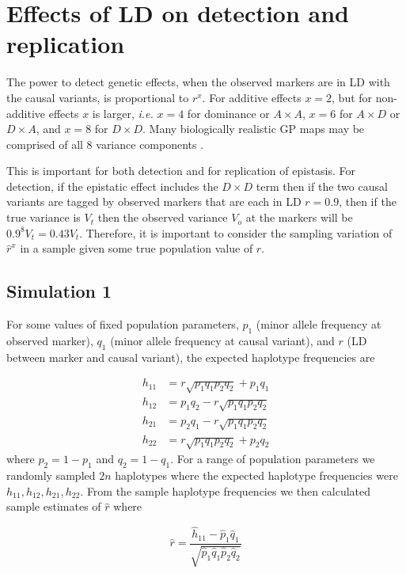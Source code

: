 \documentclass{article}
\begin{document}
\section{Effects of LD on detection and replication}

The power to detect genetic effects, when the observed markers are in LD with the causal variants, is proportional to $r^x$. For additive effects $x = 2$, but for non-additive effects $x$ is larger, \emph{i.e.} $x = 4$ for dominance or $A \times A$, $x = 6$ for $A \times D$ or $D \times A$, and $x = 8$ for $D \times D$. Many biologically realistic GP maps may be comprised of all 8 variance components \cite{Hemani2013}. 

This is important for both detection and for replication of epistasis. For detection, if the epistatic effect includes the $D \times D$ term then if the two causal variants are tagged by observed markers that are each in LD $r = 0.9$, then if the true variance is $V_{t}$ then the observed variance $V_{o}$ at the markers will be $0.9^{8}V_{t} = 0.43V_{t}$. Therefore, it is important to consider the sampling variation of $\hat{r}^x$ in a sample given some true population value of $r$. 

\subsection{Simulation 1}

For some values of fixed population parameters, $p_{1}$ (minor allele frequency at observed marker), $q_{1}$ (minor allele frequency at causal variant), and $r$ (LD between marker and causal variant), the expected haplotype frequencies are

\begin{align}
h_{11} &= r \sqrt{p_{1}q_{1}p_{2}q_{2}} + p_{1}q_{1} \\
h_{12} &= p_{1}q_{2} - r \sqrt{p_{1}q_{1}p_{2}q_{2}} \\
h_{21} &= p_{2}q_{1} - r \sqrt{p_{1}q_{1}p_{2}q_{2}} \\
h_{22} &= r \sqrt{p_{1}q_{1}p_{2}q_{2}} + p_{2}q_{2}
\end{align}
where $p_{2} = 1 - p_{1}$ and $q_{2} = 1 - q_{1}$. For a range of population parameters we randomly sampled $2n$ haplotypes where the expected haplotype frequencies were $h_{11}, h_{12}, h_{21}, h_{22}$. From the sample haplotype frequencies we then calculated sample estimates of $\hat{r}$ where 

\begin{equation}
\hat{r} = \frac{\hat{h}_{11} - \hat{p}_{1}\hat{q}_{1}}{\sqrt{\hat{p}_{1}\hat{q}_{1}\hat{p}_{2}\hat{q}_{2}}}
\end{equation}
\end{document}
